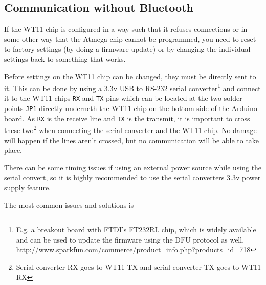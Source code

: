 \documentclass[a4paper, oneside, final]{memoir}
\begin{document}
\subsection{Communication without Bluetooth}

If the WT11 chip is configured in a way such that it refuses connections or in
some other way that the Atmega chip cannot be programmed, you need to reset to
factory settings (by doing a firmware update) or by changing the individual
settings back to something that works. 

Before settings on the WT11 chip can be changed, they must be directly sent to
it. This can be done by using a 3.3v USB to RS-232 serial converter\footnote{E.g. a
  breakout board with FTDI's FT232RL chip, which is widely available and can be
  used to update the firmware using the DFU protocol as well.
  \url{http://www.sparkfun.com/commerce/product_info.php?products_id=718}} and
connect it to the WT11 chips \texttt{RX} and \texttt{TX} pins which can be
located at the two solder points \texttt{JP1} directly underneth the WT11 chip
on the bottom side of the Arduino board. As \texttt{RX} is the receive line and
\texttt{TX} is the transmit, it is important to cross these two\footnote{Serial
  converter RX goes to WT11 TX and serial converter TX goes to WT11 RX} when
connecting the serial converter and the WT11 chip. No damage will happen if the
lines aren't crossed, but no communication will be able to take place.

There can be some timing issues if using an external power source while using
the serial convert, so it is highly recommended to use the serial converters
3.3v power supply feature.

The most common issues and solutions is
\end{document}
